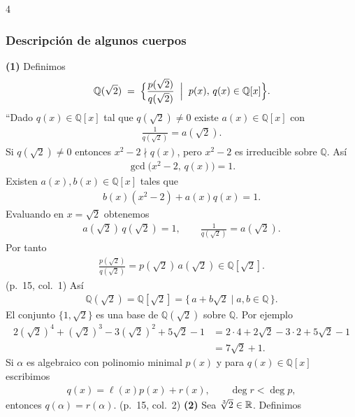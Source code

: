 \documentclass[landscape,a4paper]{article}
\begin{document}
\begin{multicols}{4}
\subsubsection*{Descripción de algunos cuerpos}
\textbf{(1)} Definimos
\begin{align*}
  \mathbb{Q}(\sqrt{2})\;=\;\Bigl\{\frac{p(\sqrt{2})}{q(\sqrt{2})}\;\Bigm|\;p(x),\,q(x)\in\mathbb{Q}[x]\Bigr\}.
\end{align*}
“Dado $q(x)\in\mathbb{Q}[x]$ tal que $q(\sqrt{2})\neq0$ existe $a(x)\in\mathbb{Q}[x]$ con
\begin{align*}
  \frac{1}{q(\sqrt{2})}=a(\sqrt{2}).
\end{align*}
Si $q(\sqrt{2})\neq0$ entonces $x^{2}-2\nmid q(x)$, pero $x^{2}-2$ es irreducible sobre $\mathbb{Q}$. Así
\begin{align*}
  \gcd\bigl(x^{2}-2,\,q(x)\bigr)=1.
\end{align*}
Existen $a(x),b(x)\in\mathbb{Q}[x]$ tales que
\begin{align*}
  b(x)(x^{2}-2)+a(x)q(x)=1.
\end{align*}
Evaluando en $x=\sqrt{2}$ obtenemos
\begin{align*}
  a(\sqrt{2})\,q(\sqrt{2})=1,\qquad\frac{1}{q(\sqrt{2})}=a(\sqrt{2}).
\end{align*}
Por tanto
\begin{align*}
  \frac{p(\sqrt{2})}{q(\sqrt{2})}=p(\sqrt{2})\,a(\sqrt{2})\in\mathbb{Q}[\sqrt{2}].
\end{align*}
(p.~15, col.~1)
Así
\begin{align*}
  \mathbb{Q}(\sqrt{2})=\mathbb{Q}[\sqrt{2}] = \{\,a+b\sqrt{2}\mid a,b\in\mathbb{Q}\,\}.
\end{align*}
El conjunto $\{1,\sqrt{2}\}$ es una base de $\mathbb{Q}(\sqrt{2})$ sobre $\mathbb{Q}$.  Por ejemplo
\begin{align*}
  2(\sqrt{2})^{4} + (\sqrt{2})^{3} - 3(\sqrt{2})^{2} + 5\sqrt{2}-1
    &= 2\cdot4 + 2\sqrt{2} - 3\cdot2 + 5\sqrt{2}-1 \\
    &= 7\sqrt{2}+1.
\end{align*}
Si $\alpha$ es algebraico con polinomio minimal $p(x)$ y para $q(x)\in\mathbb{Q}[x]$ escribimos
\begin{align*}
  q(x)=\ell(x)p(x)+r(x),\qquad\deg r<\deg p,
\end{align*}
entonces $q(\alpha)=r(\alpha)$.  (p.~15, col.~2)
\textbf{(2)} Sea $\root 3 \of 2\in\mathbb{R}$.  Definimos
\begin{align*}

\end{align*}
\end{multicols}
\end{document}
